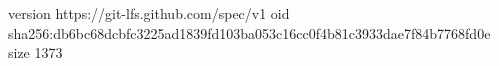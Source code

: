version https://git-lfs.github.com/spec/v1
oid sha256:db6bc68dcbfc3225ad1839fd103ba053c16cc0f4b81c3933dae7f84b7768fd0e
size 1373
